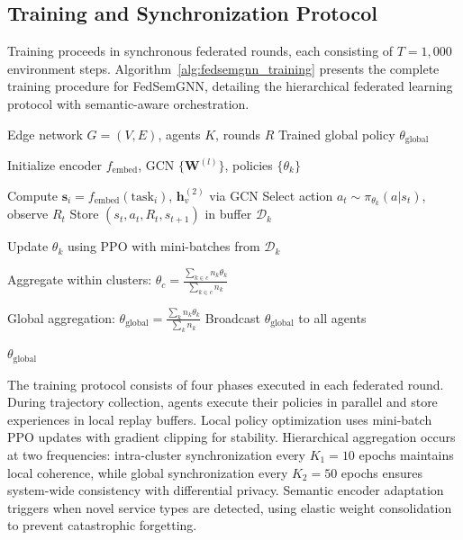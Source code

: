\subsection{Training and Synchronization Protocol}
Training proceeds in synchronous federated rounds, each consisting of $T = 1{,}000$ environment steps. Algorithm~\ref{alg:fedsemgnn_training} presents the complete training procedure for FedSemGNN, detailing the hierarchical federated learning protocol with semantic-aware orchestration.

\begin{algorithm}[t]
\caption{FedSemGNN Training Protocol}
\label{alg:fedsemgnn_training}
\begin{algorithmic}[1]
\REQUIRE Edge network $G=(V,E)$, agents $K$, rounds $R$
\ENSURE Trained global policy $\theta_{\text{global}}$

\STATE Initialize encoder $f_{\text{embed}}$, GCN $\{\mathbf{W}^{(l)}\}$, policies $\{\theta_k\}$

\STATE Compute $\mathbf{s}_i = f_{\text{embed}}(\text{task}_i)$, $\mathbf{h}_v^{(2)}$ via GCN
\STATE Select action $a_t \sim \pi_{\theta_k}(a|s_t)$, observe $R_t$
\STATE Store $(s_t, a_t, R_t, s_{t+1})$ in buffer $\mathcal{D}_k$
\ENDFOR

\STATE Update $\theta_k$ using PPO with mini-batches from $\mathcal{D}_k$
\ENDFOR

\STATE

\STATE Aggregate within clusters: $\theta_c = \frac{\sum_{k \in c} n_k \theta_k}{\sum_{k \in c} n_k}$
\ENDIF

\STATE

\STATE Global aggregation: $\theta_{\text{global}} = \frac{\sum_k n_k \theta_k}{\sum_k n_k}$
\STATE Broadcast $\theta_{\text{global}}$ to all agents
\ENDIF
\ENDFOR

\STATE

\RETURN $\theta_{\text{global}}$
\end{algorithmic}
\end{algorithm}

The training protocol consists of four phases executed in each federated round. During trajectory collection, agents execute their policies in parallel and store experiences in local replay buffers. Local policy optimization uses mini-batch PPO updates with gradient clipping for stability. Hierarchical aggregation occurs at two frequencies: intra-cluster synchronization every $K_1=10$ epochs maintains local coherence, while global synchronization every $K_2=50$ epochs ensures system-wide consistency with differential privacy. Semantic encoder adaptation triggers when novel service types are detected, using elastic weight consolidation to prevent catastrophic forgetting.


